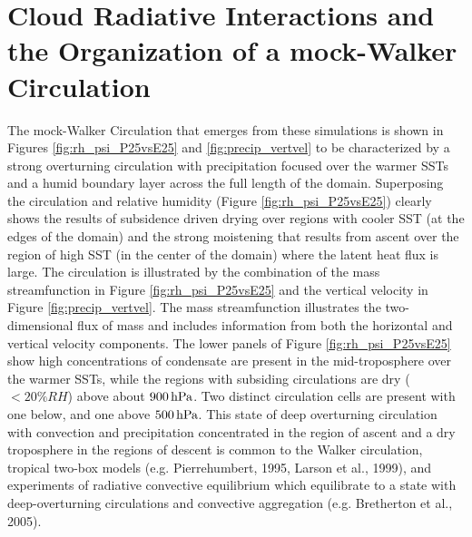 \documentclass[draft]{agujournal2019}
\begin{document}
\section{Cloud Radiative Interactions and the Organization of a mock-Walker Circulation}


The mock-Walker Circulation that emerges from these simulations is shown in Figures \ref{fig:rh_psi_P25vsE25} and 
\ref{fig:precip_vertvel} to be characterized by a strong overturning circulation with precipitation focused over the warmer 
SSTs and a humid boundary layer across the full length of the domain.    Superposing the circulation and relative 
humidity (Figure \ref{fig:rh_psi_P25vsE25}) clearly shows the results of subsidence driven 
drying over regions with cooler SST (at the edges of the domain) and the strong moistening that results from ascent over the region of high
SST (in the center of the domain) where the latent heat flux is large.   The circulation is illustrated by the combination of 
the mass streamfunction in Figure \ref{fig:rh_psi_P25vsE25} and the vertical velocity in Figure \ref{fig:precip_vertvel}.   
The mass streamfunction illustrates the 
two-dimensional flux of mass and includes information from both the horizontal and vertical velocity components.
The lower panels of Figure \ref{fig:rh_psi_P25vsE25} show high concentrations of condensate are present in the mid-troposphere over the warmer SSTs, while the regions with subsiding 
circulations are dry ($< 20\% RH$) above about $900\, \rm{hPa}$.  
Two distinct circulation cells are present with one below, and one above $500 \, \rm{hPa}$.   
This state of deep overturning circulation with convection 
and precipitation concentrated in the region of ascent and a dry troposphere in the regions of descent is common
to the Walker circulation, tropical two-box models (e.g. Pierrehumbert, 1995, Larson et al., 1999), and 
experiments of radiative convective equilibrium which equilibrate to a state with deep-overturning circulations 
and convective aggregation (e.g. Bretherton et al., 2005).
\end{document}
